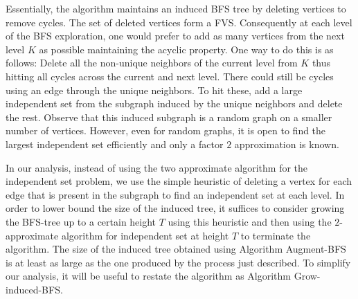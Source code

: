\documentclass[11pt]{article}
\begin{document}
Essentially, the algorithm maintains an induced BFS tree by deleting vertices to remove cycles. The set of deleted vertices form a FVS. Consequently at each level of the BFS exploration, one would prefer to add as many vertices from the next level $K$ as possible maintaining the acyclic property. One way to do this is as follows: Delete all the non-unique neighbors of the current level from $K$ thus hitting all cycles across the current and next level. There could still be cycles using an edge through the unique neighbors. To hit these, add a large independent set from the subgraph induced by the unique neighbors and delete the rest. Observe that this induced subgraph is a random graph on a smaller number of vertices. However, even for random graphs, it is open to find the largest independent set efficiently and only a factor $2$ approximation is known.

In our analysis, instead of using the two approximate algorithm for the independent set problem, we use the simple heuristic of deleting a vertex for each edge that is present in the subgraph to find an independent set at each level. In order to lower bound the size of the induced tree, it suffices to consider growing the BFS-tree up to a certain height $T$ using this heuristic and then using the $2$-approximate algorithm for independent set at height $T$ to terminate the algorithm. The size of the induced tree obtained using Algorithm Augment-BFS is at least as large as the one produced by the process just described. To simplify our analysis, it will be useful to restate the algorithm as Algorithm Grow-induced-BFS.
\end{document}
